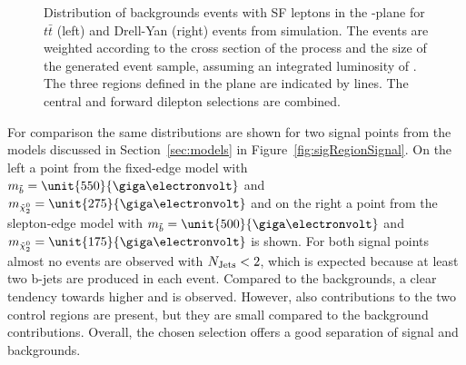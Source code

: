\begin{figure}[htbp]
\begin{minipage}[t]{0.49\textwidth}
\end{minipage}
\caption{Distribution of backgrounds events with SF leptons in the \MET-\njets plane for $t\bar{t}$ (left) and Drell-Yan (right) events from simulation. The events are weighted according to the cross section of the process and the size of the generated event sample, assuming an integrated luminosity of \lumi. The three regions defined in the plane are indicated by lines. The central and forward dilepton selections are combined.}
\label{fig:sigRegionBG}
\end{figure}  
  
For comparison the same distributions are shown for two signal points from the models discussed in Section~\ref{sec:models} in Figure~\ref{fig:sigRegionSignal}. On the left a point from the fixed-edge model with $m_{\sbottom} = \unit{550}{\giga\electronvolt}$ and $m_{\secondchi} = \unit{275}{\giga\electronvolt}$ and on the right a point from the slepton-edge model with $m_{\sbottom} = \unit{500}{\giga\electronvolt}$ and $m_{\secondchi} = \unit{175}{\giga\electronvolt}$ is shown. For both signal points almost no events are observed with $N_\text{Jets} < 2$, which is expected because at least two b-jets are produced in each event. Compared to the backgrounds, a clear tendency towards higher \MET and \njets is observed. However, also contributions to the two control regions are present, but they are small compared to the background contributions. Overall, the chosen selection offers a good separation of signal and backgrounds.
